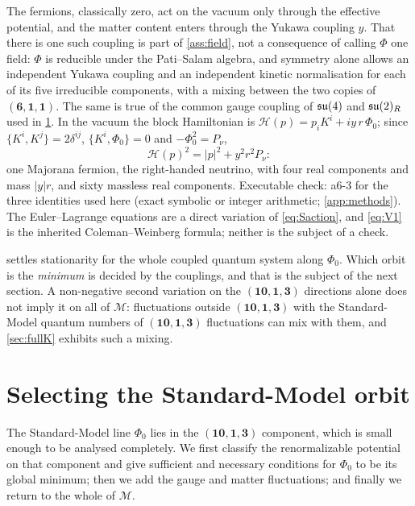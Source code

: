 The fermions, classically zero, act on the vacuum only through the effective potential, and the matter content enters through the Yukawa
coupling $y$. That there is one such coupling is part of \cref{ass:field}, not a consequence of calling $\Phi$ one field: $\Phi$ is reducible under the
Pati--Salam algebra, and symmetry alone allows an independent Yukawa coupling and an independent kinetic normalisation for each of its five irreducible
components, with a mixing between the two copies of $(\mathbf6,\mathbf1,\mathbf1)$. The same is true of the common gauge coupling of $\mathfrak{su}(4)$ and $\mathfrak{su}(2)_R$ used in
\cref{sec:selection}. In the vacuum the block Hamiltonian is $\mathcal H(p)=p_iK^i+iy\,r\,\Phi_0$; since $\{K^i,K^j\}=2\delta^{ij}$,
$\{K^i,\Phi_0\}=0$ and $-\Phi_0^2=P_\nu$,
\begin{equation}
\label{eq:blockH}
\mathcal H(p)^2=|p|^2+y^2r^2P_\nu :
\end{equation}
one Majorana fermion, the right-handed neutrino, with four real components and mass $|y|r$, and sixty massless real components.
Executable check: a6-3 for the three identities used here (exact symbolic or integer arithmetic; \cref{app:methods}). The Euler--Lagrange
equations are a direct variation of \eqref{eq:Saction}, and \eqref{eq:V1} is the inherited Coleman--Weinberg formula; neither is the subject of a check.

 settles stationarity for the whole coupled quantum system along $\Phi_0$. Which orbit is the \emph{minimum} is decided by the
couplings, and that is the subject of the next section. A non-negative second variation on the $(\mathbf{10},\mathbf1,\mathbf3)$ directions alone does not
imply it on all of $\mathcal M$: fluctuations outside $(\mathbf{10},\mathbf1,\mathbf3)$ with the Standard-Model quantum numbers of $(\mathbf{10},\mathbf1,\mathbf3)$ fluctuations can
mix with them, and \cref{sec:fullK} exhibits such a mixing.



\section{Selecting the Standard-Model orbit}
\label{sec:selection}

The Standard-Model line $\Phi_0$ lies in the $(\mathbf{10},\mathbf1,\mathbf3)$ component, which is small enough to be analysed completely. We first classify
the renormalizable potential on that component and give sufficient and necessary conditions for $\Phi_0$ to be its global minimum; then we add the gauge
and matter fluctuations;
and finally we return to the whole of $\mathcal M$.

